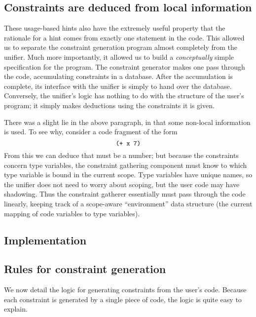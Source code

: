 \documentclass[a4paper]{article}
\begin{document}
\subsection{Constraints are deduced from local information}
These usage-based hints also have the extremely useful property that the
rationale for a hint comes from exactly one statement in the code.  This allowed
us to separate the constraint generation program almost completely from the
unifier.  Much more importantly, it allowed us to build a {\em conceptually}
simple specification for the program.  The constraint generator makes one pass
through the code, accumulating constraints in a database.  After the
accumulation is complete, its interface with the unifier is simply to hand over
the database.  Conversely, the unifier's logic has nothing to do with the
structure of the user's program; it simply makes deductions using the
constraints it is given.

There was a slight lie in the above paragraph, in that some non-local
information is used.  To see why, consider a code fragment of the form
\[ \texttt{(+ x 7)} \]
From this we can deduce that  must be a number; but because the constraints
concern type variables, the constraint gathering component must know to which
type variable  is bound in the current scope.  Type variables have unique
names, so the unifier does not need to worry about scoping, but the user code
may have shadowing.  Thus the constraint gatherer essentially must pass through
the code linearly, keeping track of a scope-aware ``environment'' data structure
(the current mapping of code variables to type variables).

\subsection{Implementation}

\subsection{Rules for constraint generation}
We now detail the logic for generating constraints from the user's code.
Because each constraint is generated by a single piece of code, the logic is
quite easy to explain.
\end{document}
